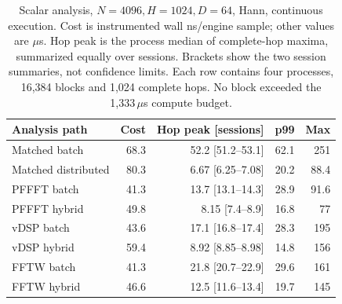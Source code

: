 \begin{table}[htbp]
\centering\small
\begin{tabular}{@{}lrrrr@{}}
\toprule
Analysis path & Cost & Hop peak [sessions] & p99 & Max \\
\midrule
Matched batch & 68.3 & 52.2 [51.2--53.1] & 62.1 & 251 \\
Matched distributed & 80.3 & 6.67 [6.25--7.08] & 20.2 & 88.4 \\
PFFFT batch & 41.3 & 13.7 [13.1--14.3] & 28.9 & 91.6 \\
PFFFT hybrid & 49.8 & 8.15 [7.4--8.9] & 16.8 & 77 \\
vDSP batch & 43.6 & 17.1 [16.8--17.4] & 28.3 & 195 \\
vDSP hybrid & 59.4 & 8.92 [8.85--8.98] & 14.8 & 156 \\
FFTW batch & 41.3 & 21.8 [20.7--22.9] & 29.6 & 161 \\
FFTW hybrid & 46.6 & 12.5 [11.6--13.4] & 19.7 & 145 \\
\bottomrule
\end{tabular}
\caption{Scalar analysis, $N=4096,H=1024,D=64$, Hann, continuous execution. Cost is instrumented wall ns/engine sample; other values are $\mu$s. Hop peak is the process median of complete-hop maxima, summarized equally over sessions. Brackets show the two session summaries, not confidence limits. Each row contains four processes, 16,384 blocks and 1,024 complete hops. No block exceeded the 1,333\,$\mu$s compute budget.}
\label{tab:study-baselines}
\end{table}

